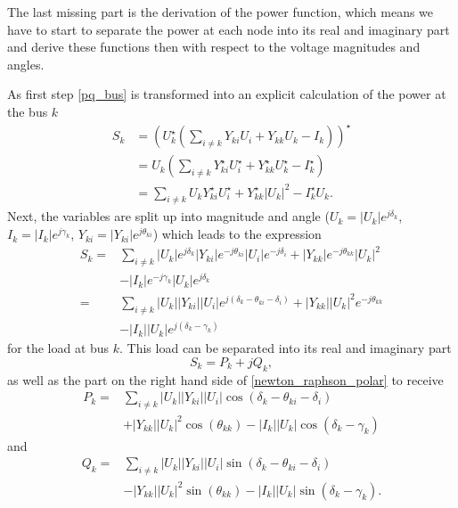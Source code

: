 The last missing part is the derivation of the power function, which means we have to start to separate the power at each node into its real and imaginary part and derive these functions then with respect to the voltage magnitudes and angles.

As first step \eqref{pq_bus} is transformed into an explicit calculation of the power at the bus $k$
\begin{align}
	S_k &= \left( U_k^\star \left( \sum_{i \ne k} Y_{ki} U_i + Y_{kk} U_k - I_k \right) \right)^\star \\
		&= U_k \left( \sum_{i \ne k} Y_{ki}^\star U_i^\star + Y_{kk}^\star U_k^\star - I_k^\star \right) \\
		&= \sum_{i \ne k} U_k Y_{ki}^\star U_i^\star + Y_{kk}^\star |U_k|^2 - I_k^\star U_k.
\end{align}
Next, the variables are split up into magnitude and angle ($U_k = |U_k| e^{j \delta_k}$, $I_k = |I_k| e^{j \gamma_k}$, $Y_{ki} = |Y_{ki}| e^{j \theta_{ki}}$) which leads to the expression
\begin{equation}
	\begin{split}
		S_k = 	& \sum_{i \ne k} |U_k| e^{j \delta_k} |Y_{ki}| e^{-j \theta_{ki}} |U_i| e^{-j \delta_i} + |Y_{kk}| e^{-j \theta_{kk}} |U_k|^2 \\
				& - |I_k| e^{-j \gamma_k} |U_k| e^{j \delta_k} \\
			= 	& \sum_{i \ne k} |U_k| |Y_{ki}| |U_i| e^{j \left( \delta_k - \theta_{ki} - \delta_i \right)} + |Y_{kk}| |U_k|^2 e^{-j \theta_{kk}} \\
				& - |I_k| |U_k| e^{j \left( \delta_k - \gamma_k \right)}
	\end{split}
	\label{eq:newton_raphson_polar}
\end{equation}
for the load at bus $k$. This load can be separated into its real and imaginary part
\begin{equation}
	S_k = P_k + j Q_k,
\end{equation}
as well as the part on the right hand side of \eqref{newton_raphson_polar} to receive
\begin{equation}
	\begin{split}
		P_k = 	& \sum_{i \ne k} |U_k| |Y_{ki}| |U_i| \cos \left( \delta_k - \theta_{ki} - \delta_i \right) \\
				& + |Y_{kk}| |U_k|^2 \cos \left( \theta_{kk} \right) - |I_k| |U_k| \cos \left( \delta_k - \gamma_k \right)
	\end{split}
\end{equation}
and
\begin{equation}
	\begin{split}
		Q_k = 	& \sum_{i \ne k} |U_k| |Y_{ki}| |U_i| \sin \left( \delta_k - \theta_{ki} - \delta_i \right) \\
				& - |Y_{kk}| |U_k|^2 \sin \left( \theta_{kk} \right) - |I_k| |U_k| \sin \left( \delta_k - \gamma_k \right).
	\end{split}
\end{equation}
